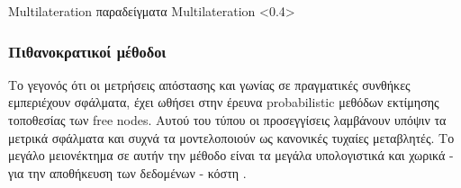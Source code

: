 %
{Multilateration παραδείγματα}%
{Multilateration}%
<0.4>

\subsubsection{Πιθανοκρατικοί μέθοδοι}%
Το γεγονός ότι οι μετρήσεις απόστασης και γωνίας σε πραγματικές συνθήκες εμπε\-ριέ\-χουν σφάλματα, έχει ωθήσει στην έρευνα 
probabilistic μεθόδων εκτίμησης τοποθεσίας των free nodes. Αυτού του τύπου οι προσεγγίσεις λαμβάνουν υπόψιν τα μετρικά σφάλματα και συχνά τα μοντελοποιούν ως κανονικές
τυχαίες μεταβλητές. Το μεγάλο μειονέκτημα σε αυτήν την μέθοδο είναι τα μεγάλα υπολογιστικά και χωρικά - για την αποθήκευση των δεδομένων - κόστη \cite{wsn-Localization-systems}. 

